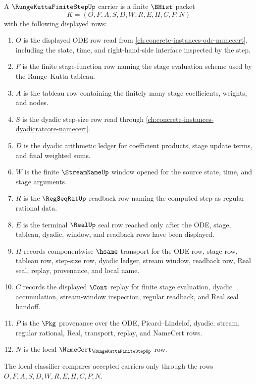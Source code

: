 \begin{definition}
\label{def:runge-kutta-finite-step-carrier}
A $\RungeKuttaFiniteStepUp$ carrier is a finite $\BHist$ packet
$$
K=(O,F,A,S,D,W,R,E,H,C,P,N)
$$
with the following displayed rows:
\begin{enumerate}
\item $O$ is the displayed ODE row read from \autoref{ch:concrete-instances-ode-namecert}, including the state, time, and right-hand-side interface inspected by the step.
\item $F$ is the finite stage-function row naming the stage evaluation scheme used by the Runge--Kutta tableau.
\item $A$ is the tableau row containing the finitely many stage coefficients, weights, and nodes.
\item $S$ is the dyadic step-size row read through \autoref{ch:concrete-instances-dyadicratcore-namecert}.
\item $D$ is the dyadic arithmetic ledger for coefficient products, stage update terms, and final weighted sums.
\item $W$ is the finite $\StreamNameUp$ window opened for the source state, time, and stage arguments.
\item $R$ is the $\RegSeqRatUp$ readback row naming the computed step as regular rational data.
\item $E$ is the terminal $\RealUp$ seal row reached only after the ODE, stage, tableau, dyadic, window, and readback rows have been displayed.
\item $H$ records componentwise $\hsame$ transport for the ODE row, stage row, tableau row, step-size row, dyadic ledger, stream window, readback row, Real seal, replay, provenance, and local name.
\item $C$ records the displayed $\Cont$ replay for finite stage evaluation, dyadic accumulation, stream-window inspection, regular readback, and Real seal handoff.
\item $P$ is the $\Pkg$ provenance over the ODE, Picard--Lindelof, dyadic, stream, regular rational, Real, transport, replay, and NameCert rows.
\item $N$ is the local $\NameCert_{\RungeKuttaFiniteStepUp}$ row.
\end{enumerate}
The local classifier compares accepted carriers only through the rows $O,F,A,S,D,W,R,E,H,C,P,N$.
\end{definition}

